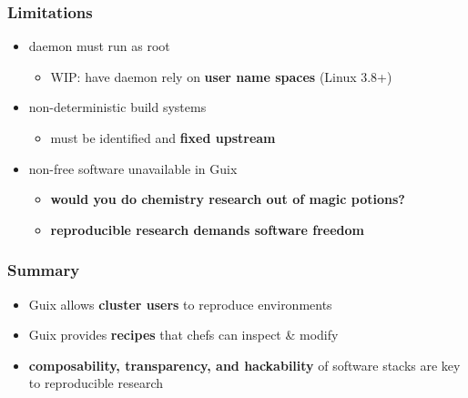 \documentclass{beamer}
\newcommand{\highlight}[1]{\alert{\textbf{#1}}}
\begin{document}
\begin{frame}
  \frametitle{Limitations}

  \Large{
    \begin{itemize}
    \item{daemon must run as root
      \begin{itemize}
      \item<2-> WIP: have daemon rely on \textbf{user name spaces} (Linux
        3.8+)
    \end{itemize}}
    \item{non-deterministic build systems
      \begin{itemize}
      \item<3->must be identified and \textbf{fixed upstream}
    \end{itemize}}
    \item{non-free software unavailable in Guix
      \begin{itemize}
      \item<4-> \textbf<4>{would you do chemistry research out of magic
        potions?}
      \item<5-> \textbf{reproducible research demands software freedom}
    \end{itemize}}
    \end{itemize}
  }
\end{frame}

\begin{frame}
  \frametitle{Summary}

  \Large{
    \begin{itemize}
    \item<1-> Guix allows \highlight{cluster users} to reproduce
      environments
    \item<2-> Guix provides \highlight{recipes} that chefs can
      inspect \& modify
    \item<3-> \highlight{composability, transparency, and hackability}
      of software stacks are key to reproducible research
    \end{itemize}
  }
\end{frame}
\end{document}
